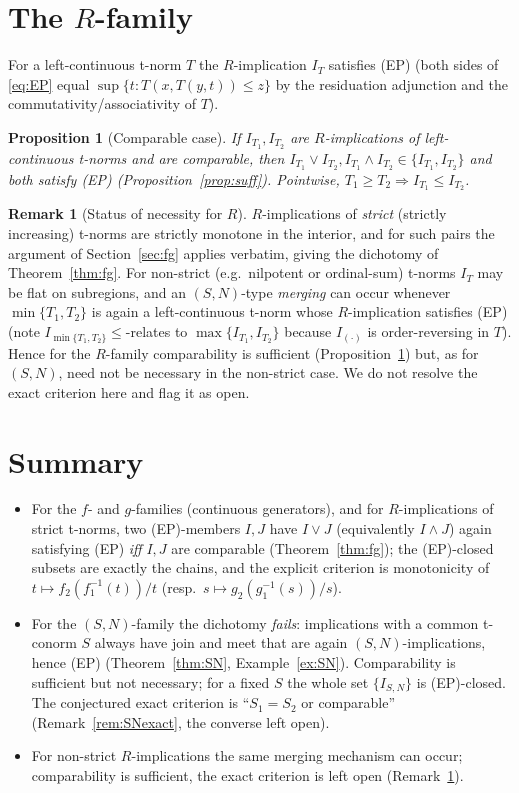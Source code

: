 \documentclass{amsart}
\theoremstyle{plain}
\newtheorem{proposition}{Proposition}
\theoremstyle{definition}
\newtheorem{remark}{Remark}
\begin{document}
\section{The $R$-family}\label{sec:R}

For a left-continuous t-norm $T$ the $R$-implication $I_T$ satisfies (EP) (both sides of
\eqref{eq:EP} equal $\sup\{t:T(x,T(y,t))\le z\}$ by the residuation adjunction and the
commutativity/associativity of $T$).

\begin{proposition}[Comparable case]\label{prop:R}
If $I_{T_1},I_{T_2}$ are $R$-implications of left-continuous t-norms and are comparable,
then $I_{T_1}\vee I_{T_2},I_{T_1}\wedge I_{T_2}\in\{I_{T_1},I_{T_2}\}$ and both satisfy
\textup{(EP)} (Proposition~\ref{prop:suff}).  Pointwise, $T_1\ge T_2\Rightarrow
I_{T_1}\le I_{T_2}$.
\end{proposition}

\begin{remark}[Status of necessity for $R$]\label{rem:R}
$R$-implications of \emph{strict} (strictly increasing) t-norms are strictly monotone in
the interior, and for such pairs the argument of Section~\ref{sec:fg} applies verbatim,
giving the dichotomy of Theorem~\ref{thm:fg}.  For non-strict (e.g.\ nilpotent or
ordinal-sum) t-norms $I_T$ may be flat on subregions, and an
$(S,N)$-type \emph{merging} can occur whenever $\min\{T_1,T_2\}$ is again a left-continuous
t-norm whose $R$-implication satisfies (EP) (note $I_{\min\{T_1,T_2\}}\le$-relates to
$\max\{I_{T_1},I_{T_2}\}$ because $I_{(\cdot)}$ is order-reversing in $T$).  Hence for the
$R$-family comparability is sufficient (Proposition~\ref{prop:R}) but, as for $(S,N)$, need
not be necessary in the non-strict case.  We do not resolve the exact criterion here and
flag it as open.
\end{remark}

\section{Summary}

\begin{itemize}
\item For the $f$- and $g$-families (continuous generators), and for $R$-implications of
strict t-norms, two (EP)-members $I,J$ have $I\vee J$ (equivalently $I\wedge J$) again
satisfying (EP) \emph{iff} $I,J$ are comparable (Theorem~\ref{thm:fg}); the
(EP)-closed subsets are exactly the chains, and the explicit criterion is monotonicity of
$t\mapsto f_2(f_1^{-1}(t))/t$ (resp.\ $s\mapsto g_2(g_1^{-1}(s))/s$).
\item For the $(S,N)$-family the dichotomy \emph{fails}: implications with a common
t-conorm $S$ always have join and meet that are again $(S,N)$-implications, hence (EP)
(Theorem~\ref{thm:SN}, Example~\ref{ex:SN}).  Comparability is sufficient but not
necessary; for a fixed $S$ the whole set $\{I_{S,N}\}$ is (EP)-closed.  The conjectured
exact criterion is ``$S_1=S_2$ or comparable'' (Remark~\ref{rem:SNexact}, the converse left
open).
\item For non-strict $R$-implications the same merging mechanism can occur; comparability
is sufficient, the exact criterion is left open (Remark~\ref{rem:R}).
\end{itemize}
\end{document}
